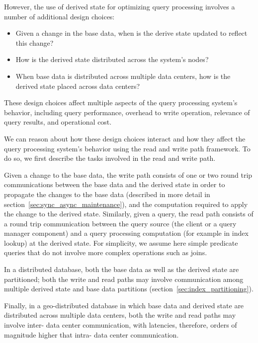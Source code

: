 However, the use of derived state for optimizing query processing involves a number of additional design choices:
\begin{itemize}

  \item Given a change in the base data, when is the derive state updated to reflect this change?

  \item How is the derived state distributed across the system's nodes?

  \item When base data is distributed across multiple data centers, how is the derived state placed across data centers?

\end{itemize}

These design choices affect multiple aspects of the query processing system's behavior,
including query performance, overhead to write operation, relevance of query results, and operational cost.

We can reason about how these design choices interact and how they affect the query processing system's behavior
using the read and write path framework.
To do so, we first describe the tasks involved in the read and write path.

\medskip

Given a change to the base data,
the write path consists of one or two round trip communications between the base data and the derived state
in order to propagate the changes to the base data (described in more detail in section~\ref{sec:sync_async_maintenance}),
and the computation required to apply the change to the derived state.
Similarly, given a query, the read path consists of a round trip communication between the query source (the client or a
query manager component) and a query processing computation (for example in index lookup) at the derived state.
For simplicity, we assume here simple predicate queries that do not involve more complex operations such as joins.

In a distributed database, both the base data as well as the derived state are partitioned;
both the write and read paths may involve communication among multiple derived state and base data
partitions (section~\ref{sec:index_partitioning}).

Finally, in a geo-distributed database in which base data and derived state are distributed across multiple data centers,
both the write and read paths may involve inter- data center communication, with latencies, therefore, orders of magnitude
higher that intra- data center communication.


